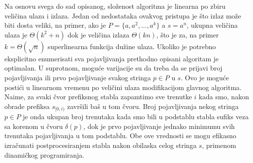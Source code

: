 Na osnovu svega do sad opisanog, slo\v zenost algoritma je linearna po zbiru veli\v cina ulaza i izlaza. Jedan od nedostataka ovakvog pristupa je \v sto izlaz mo\v ze biti dosta veliki, na primer, ako je $P = \{a, a^2, \ldots, a^k\}$ a $s = a^n$, ukupna veli\v cina ulaza je $\Theta(k^2+n)$ dok je veli\v cina izlaza $\Theta(kn)$, \v sto je za, na primer $k = \Theta(\sqrt{n})$ superlinearna funkcija du\v zine ulaza. Ukoliko je potrebno eksplicitno enumerisati sva pojavljivanja prethodno opisani algoritam je optimalan. U suprotnom, mogu\' ce varijacije su da treba da se prijavi broj pojavljivanja ili prvo pojavljivanje svakog stringa $p \in P$ u $s$. Ovo je mogu\' ce posti\' ci u linearnom vremenu po veli\v cini ulaza modifikacijom glavnog algoritma. Naime, za svaki \v cvor prefiksnog stabla zapamtimo sve trenutke $i$ kada smo, nakon obrade prefiksa $s_{[0, i)}$ zavr\v sili ba\v s u tom \v cvoru. Broj pojavljivanja nekog stringa $p \in P$ je onda ukupan broj trenutaka kada smo bili u podstablu stabla sufiks veza sa korenom u \v cvoru $\delta(p)$, dok je prvo pojavljivanje jednako minimumu svih trenutaka pojavljivanja u tom podstablu. Obe ove vrednosti se mogu efikasno izra\v cunati postprocesiranjem stabla nakon obilaska celog stringa $s$, primenom dinami\v ckog programiranja.
